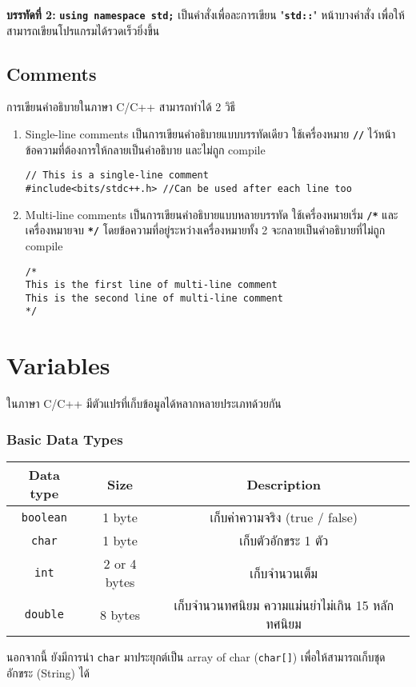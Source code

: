 \textbf{บรรทัดที่ 2:} \textbf{\texttt{using namespace std;}} เป็นคำสั่งเพื่อละการเขียน "\textbf{\texttt{std::}}" หน้าบางคำสั่ง เพื่อให้สามารถเขียนโปรแกรมได้รวดเร็วยิ่งขึ้น

\subsection{Comments}
การเขียนคำอธิบายในภาษา C/C++ สามารถทำได้ 2 วิธี
\begin{enumerate}
\item Single-line comments เป็นการเขียนคำอธิบายแบบบรรทัดเดียว ใช้เครื่องหมาย \textbf{\texttt{//}} ไว้หน้าข้อความที่ต้องการให้กลายเป็นคำอธิบาย และไม่ถูก compile 
\begin{lstlisting}
// This is a single-line comment
#include<bits/stdc++.h>	//Can be used after each line too 
\end{lstlisting}
\item Multi-line comments เป็นการเขียนคำอธิบายแบบหลายบรรทัด ใช้เครื่องหมายเริ่ม \textbf{\texttt{/*}} และเครื่องหมายจบ \textbf{\texttt{*/}} โดยข้อความที่อยู่ระหว่างเครื่องหมายทั้ง 2 จะกลายเป็นคำอธิบายที่ไม่ถูก compile
\begin{lstlisting}
/*
This is the first line of multi-line comment
This is the second line of multi-line comment
*/
\end{lstlisting}
\end{enumerate}

\section{Variables}
ในภาษา C/C++ มีตัวแปรที่เก็บข้อมูลได้หลากหลายประเภทด้วยกัน
\subsubsection{Basic Data Types}
\begin{center}
\begin{tabular}{||c|c|c||}
\hline
\textbf{Data type} & \textbf{Size} & \textbf{Description} \\
\hline
\texttt{boolean} & 1 byte & เก็บค่าความจริง (true / false) \\
\texttt{char} & 1 byte & เก็บตัวอักขระ 1 ตัว \\
\texttt{int} & 2 or 4 bytes & เก็บจำนวนเต็ม \\
\texttt{double} & 8 bytes & เก็บจำนวนทศนิยม ความแม่นยำไม่เกิน 15 หลักทศนิยม \\
\hline
\end{tabular}
\end{center}
นอกจากนี้ ยังมีการนำ \texttt{char} มาประยุกต์เป็น array of char (\texttt{char[]}) เพื่อให้สามารถเก็บชุดอักขระ (String) ได้
